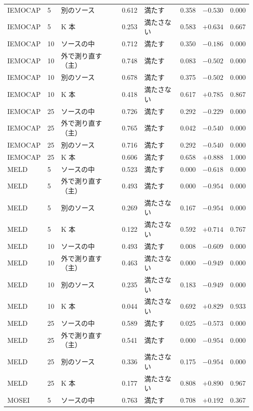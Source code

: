 \begin{longtable}{llp{3.0cm}rlrrr}
IEMOCAP & 5 & 別のソース & 0.612 & 満たす & 0.358 & $-0.530$ & 0.000 \\
IEMOCAP & 5 & K 本 & 0.253 & 満たさない & 0.583 & $+0.634$ & 0.667 \\
IEMOCAP & 10 & ソースの中 & 0.712 & 満たす & 0.350 & $-0.186$ & 0.000 \\
IEMOCAP & 10 & 外で測り直す（主） & 0.748 & 満たす & 0.083 & $-0.502$ & 0.000 \\
IEMOCAP & 10 & 別のソース & 0.678 & 満たす & 0.375 & $-0.502$ & 0.000 \\
IEMOCAP & 10 & K 本 & 0.418 & 満たさない & 0.617 & $+0.785$ & 0.867 \\
IEMOCAP & 25 & ソースの中 & 0.726 & 満たす & 0.292 & $-0.229$ & 0.000 \\
IEMOCAP & 25 & 外で測り直す（主） & 0.765 & 満たす & 0.042 & $-0.540$ & 0.000 \\
IEMOCAP & 25 & 別のソース & 0.716 & 満たす & 0.292 & $-0.540$ & 0.000 \\
IEMOCAP & 25 & K 本 & 0.606 & 満たす & 0.658 & $+0.888$ & 1.000 \\
\midrule
MELD & 5 & ソースの中 & 0.523 & 満たす & 0.000 & $-0.618$ & 0.000 \\
MELD & 5 & 外で測り直す（主） & 0.493 & 満たす & 0.000 & $-0.954$ & 0.000 \\
MELD & 5 & 別のソース & 0.269 & 満たさない & 0.167 & $-0.954$ & 0.000 \\
MELD & 5 & K 本 & 0.122 & 満たさない & 0.592 & $+0.714$ & 0.767 \\
MELD & 10 & ソースの中 & 0.493 & 満たす & 0.008 & $-0.609$ & 0.000 \\
MELD & 10 & 外で測り直す（主） & 0.463 & 満たさない & 0.000 & $-0.949$ & 0.000 \\
MELD & 10 & 別のソース & 0.235 & 満たさない & 0.183 & $-0.949$ & 0.000 \\
MELD & 10 & K 本 & 0.044 & 満たさない & 0.692 & $+0.829$ & 0.933 \\
MELD & 25 & ソースの中 & 0.589 & 満たす & 0.025 & $-0.573$ & 0.000 \\
MELD & 25 & 外で測り直す（主） & 0.541 & 満たす & 0.000 & $-0.954$ & 0.000 \\
MELD & 25 & 別のソース & 0.336 & 満たさない & 0.175 & $-0.954$ & 0.000 \\
MELD & 25 & K 本 & 0.177 & 満たさない & 0.808 & $+0.890$ & 0.967 \\
\midrule
MOSEI & 5 & ソースの中 & 0.763 & 満たす & 0.708 & $+0.192$ & 0.367 \\

\end{longtable}
